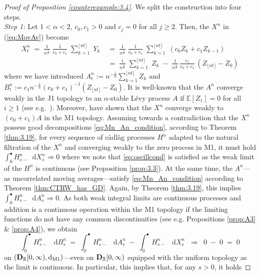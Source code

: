 \documentclass[11pt]{article}
\theoremstyle{definition}\newtheorem{example}[theorem]{Example}
\theoremstyle{definition}\newtheorem{counterexample}[theorem]{Counterexample}
\theoremstyle{definition}\newtheorem{remark}[theorem]{Remark}
\theoremstyle{definition}\newtheorem{defi}[theorem]{Definition}
\numberwithin{equation}{section}
\newcommand{\R}{\mathbb{R}}
\newcommand{\D}{{\bf D}}											%
\newcommand*\diff{\mathop{}\!\mathrm{d}}								%
\newcommand{\E}{\mathbb{E}}											%
\renewcommand{\|}{\; : \, \;}											%
\newcommand{\dM}{\diff_{\operatorname{M1}}}							%
\begin{document}
\begin{proof}[Proof of Proposition \ref{counterexample:3.4}] We split the construction into four steps.\\
	\phantom{ee} \emph{Step 1:} Let $1<\alpha<2$, $c_0,c_1 >0$ and $c_j=0$ for all $j\ge 2$.  Then, the $X^n$ in (\ref{eq:MovAv}) become
	\begin{align*} X^n_t \; = \; \frac{1}{n^{\frac1\alpha}} \; \frac{1}{c_0+c_1} \; \sum_{k=1}^{\lfloor nt \rfloor} \; Y_k \; &= \; \frac{1}{n^{\frac1\alpha}} \; \frac{1}{c_0+c_1} \; \sum_{k=1}^{\lfloor nt \rfloor} \; (c_0Z_k + c_1 Z_{k-1}) \\
		&= \; \frac{1}{n^{\frac1\alpha}} \;   \sum_{k=1}^{\lfloor nt \rfloor} \; Z_k \; - \; \frac{1}{n^{\frac1\alpha}}\, \frac{c_1}{c_0+c_1} \, ( Z_{\lfloor n t\rfloor} - Z_0) 
	\end{align*}
	where we have introduced $A^n_t:=n^{-\frac1\alpha}  \sum_{k=1}^{\lfloor nt \rfloor} Z_k$ and $B^n_t:=c_1 n^{-\frac1\alpha} (c_0+c_1)^{-1}  ( Z_{\lfloor n t\rfloor} - Z_0)$. It is well-known that the $A^n$ converge weakly in the J1 topology to an $\alpha$-stable Lévy process $A$ if $\E[Z_1]=0$ for all $i\ge 1$ (see e.g.~\cite{skorokhod}). Moreover, \cite{avram} have shown that the $X^n$ converge weakly to $(c_0+c_1)A$ in the M1 topology. Assuming towards a contradiction that the $X^n$ possess good decompositions \eqref{eq:Mn_An_condition}, according to Theorem \ref{thm:3.19}, for every sequence of càdlàg processes $H^n$ adapted to the natural filtration of the $X^n$ and converging weakly to the zero process in M1, it must hold 
	$ \int_0^\bullet  H^n_{s-} \diff X^n_s \Rightarrow  0$ where we note that \eqref{eq:oscillcond} is satisfied as the weak limit of the $H^n$ is continuous (see Proposition \ref{prop:3.3}). At the same time, the $A^n$---as uncorrelated moving averages---satisfy \eqref{eq:Mn_An_condition} according to Theorem \ref{thm:CTRW_has_GD}. Again, by Theorem \ref{thm:3.19}, this implies $ \int_0^\bullet H^n_{s-} \diff A^n_s \Rightarrow 0$. As both weak integral limits are continuous processes and addition is a continuous operation within the M1 topology if the limiting functions do not have any common discontinuities (see e.g. Propositions \ref{prop:A3} \& \ref{prop:A4}), we obtain
	$$ \int_0^\bullet \, H^n_{s-} \; \diff B^n_s \; = \; \int_0^\bullet \, H^n_{s-} \; \diff A^n_s \; - \; \int_0^\bullet \, H^n_{s-} \; \diff X^n_s \; \; \Rightarrow \; \; 0 \; - \; 0 \; = \; 0$$
	on $(\D_{\R}[0,\infty), \dM)$---even on $\D_{\R}[0,\infty)$ equipped with the uniform topology as the limit is continuous. In particular, this implies that, for any $s>0$, it holds

\end{proof}
\end{document}
